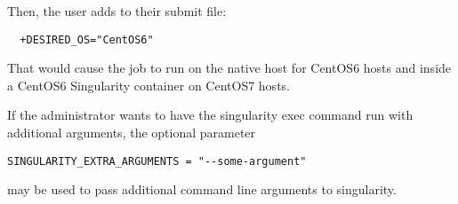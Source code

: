 Then, the user adds to their submit file:

\begin{verbatim}
  +DESIRED_OS="CentOS6"
\end{verbatim}

That would cause the job to run on the native host for CentOS6 hosts
and inside a CentOS6 Singularity container on CentOS7 hosts.

If the administrator wants to have the singularity exec command run with 
additional arguments, the optional parameter

\begin{verbatim}
SINGULARITY_EXTRA_ARGUMENTS = "--some-argument"
\end{verbatim}

may be used to pass additional command line arguments to singularity.

